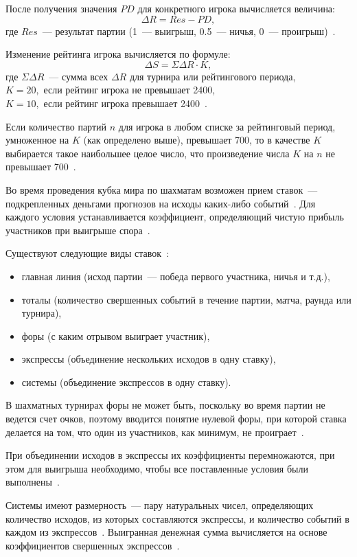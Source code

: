 После получения значения $PD$ для конкретного игрока вычисляется величина:
\begin{equation}\label{dr}
	\Delta{R} = Res - PD,
\end{equation}
где $Res$~--- результат партии (1~--- выигрыш, 0.5~--- ничья, 0~--- проигрыш)~\cite{fideraiting}.

Изменение рейтинга игрока вычисляется по формуле:
\begin{equation}\label{raitingdelta}
	\Delta{S} = \Sigma{\Delta{R}} \cdot K,
\end{equation}
где $\Sigma{\Delta{R}}$~--- сумма всех $\Delta{R}$ для турнира или рейтингового периода,\\
\text{~~~~~~}$K = 20,$ если рейтинг игрока не превышает 2400,\\
\text{~~~~~~}$K = 10,$ если рейтинг игрока превышает 2400~\cite{fideraiting}.

Если количество партий $n$ для игрока в любом списке за рейтинговый период, умноженное на $K$ (как определено выше), превышает 700, то в качестве $K$ выбирается такое наибольшее целое число, что произведение числа $K$ на $n$ не превышает 700~\cite{fideraiting}.

Во время проведения кубка мира по шахматам возможен прием ставок~--- подкрепленных деньгами прогнозов на исходы каких-либо событий~\cite{bet}. Для каждого условия устанавливается коэффициент, определяющий чистую прибыль участников при выигрыше спора~\cite{bet}.

Существуют следующие виды ставок~\cite{bet}:
\begin{itemize}
	\item главная линия (исход партии~--- победа первого участника, ничья и т.д.),
	\item тоталы (количество свершенных событий в течение партии, матча, раунда или турнира),
	\item форы (с каким отрывом выиграет участник),
	\item экспрессы (объединение нескольких исходов в одну ставку),
	\item системы (объединение экспрессов в одну ставку).
\end{itemize}

В шахматных турнирах форы не может быть, поскольку во время партии не ведется счет очков, поэтому вводится понятие нулевой форы, при которой ставка делается на том, что один из участников, как минимум, не проиграет~\cite{chessbet}.

При объединении исходов в экспрессы их коэффициенты перемножаются, при этом для выигрыша необходимо, чтобы все поставленные условия были выполнены~\cite{bet}.

Системы имеют размерность~--- пару натуральных чисел, определяющих количество исходов, из которых составляются экспрессы, и количество событий в каждом из экспрессов~\cite{bet}. Выигранная денежная сумма вычисляется на основе коэффициентов свершенных экспрессов~\cite{bet}.

\clearpage
